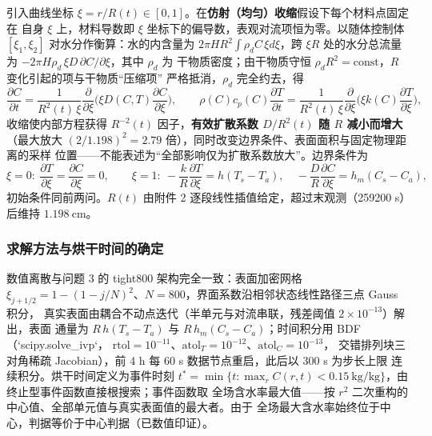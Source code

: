 引入曲线坐标 $\xi=r/R(t)\in[0,1]$。在\textbf{仿射（均匀）收缩}假设下每个材料点固定在
自身 $\xi$ 上，材料导数即 $\xi$ 坐标下的偏导数，表观对流项恒为零。以随体控制体
$[\xi_1,\xi_2]$ 对水分作衡算：水的内含量为 $2\pi H R^2\int\rho_d C\,\xi d\xi$，跨
$\xi R$ 处的水分总流量为 $-2\pi H\rho_d\,\xi D\,\partial C/\partial\xi$，其中 $\rho_d$ 为
干物质密度；由干物质守恒 $\rho_dR^2=\mathrm{const}$，$R$ 变化引起的项与干物质“压缩项”
严格抵消，$\rho_d$ 完全约去，得
\begin{equation}
  \frac{\partial C}{\partial t}
  =\frac{1}{R^2(t)\,\xi}\frac{\partial}{\partial\xi}\Big(\xi D(C,T)\frac{\partial C}{\partial\xi}\Big),
  \qquad
  \rho(C)c_p(C)\frac{\partial T}{\partial t}
  =\frac{1}{R^2(t)\,\xi}\frac{\partial}{\partial\xi}\Big(\xi k(C)\frac{\partial T}{\partial\xi}\Big),
  \label{eq:mov}
\end{equation}
收缩使内部方程获得 $R^{-2}(t)$ 因子，\textbf{有效扩散系数 $D/R^2(t)$ 随 $R$ 减小而增大}
（最大放大 $(2/1.198)^2=2.79$ 倍），同时改变边界条件、表面面积与固定物理距离的采样
位置——不能表述为“全部影响仅为扩散系数放大”。边界条件为
\begin{equation}
  \xi=0:\ \frac{\partial T}{\partial\xi}=\frac{\partial C}{\partial\xi}=0,\qquad
  \xi=1:\ -\frac{k}{R}\frac{\partial T}{\partial\xi}=h(T_s-T_a),\quad
  -\frac{D}{R}\frac{\partial C}{\partial\xi}=h_m(C_s-C_a),
  \label{eq:movbc}
\end{equation}
初始条件同前两问。$R(t)$ 由附件 2 逐段线性插值给定，超过末观测（259200 s）后维持
$1.198\ \mathrm{cm}$。

\subsubsection{求解方法与烘干时间的确定}

数值离散与问题 3 的 tight800 架构完全一致：表面加密网格
$\xi_{j+1/2}=1-(1-j/N)^2$、$N=800$，界面系数沿相邻状态线性路径三点 Gauss 积分，
真实表面由耦合不动点迭代（半单元与对流串联，残差阈值 $2\times10^{-13}$）解出，表面
通量为 $R\,h(T_s-T_a)$ 与 $R\,h_m(C_s-C_a)$；时间积分用 BDF（`scipy.solve_ivp`，
$\mathrm{rtol}=10^{-11}$、$\mathrm{atol}_T=10^{-12}$、$\mathrm{atol}_C=10^{-13}$，
交错排列块三对角稀疏 Jacobian），前 4 h 每 60 s 数据节点重启，此后以 300 s 为步长上限
连续积分。烘干时间定义为事件时刻
$t^*=\min\{t:\max_r C(r,t)<0.15\ \mathrm{kg/kg}\}$，由终止型事件函数直接根搜索；事件函数取
全场含水率最大值——按 $r^2$ 二次重构的中心值、全部单元值与真实表面值的最大者。由于
全场最大含水率始终位于中心，判据等价于中心判据（已数值印证）。


